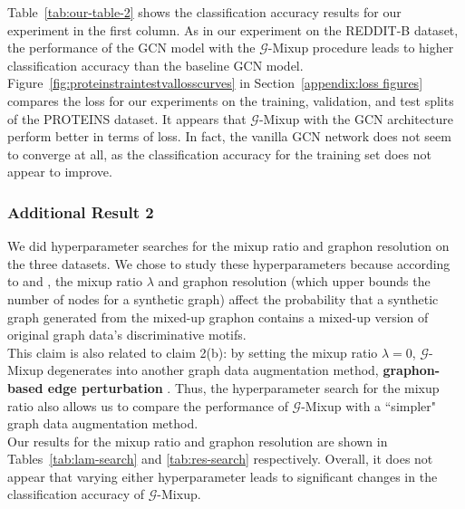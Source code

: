 Table~\ref{tab:our-table-2} shows the classification accuracy results for our experiment in the first column. As in our experiment on the REDDIT-B dataset, the performance of the GCN model with the $\mathcal{G}$-Mixup procedure leads to higher classification accuracy than the baseline GCN model. 
\\

Figure~\ref{fig:proteinstraintestvallosscurves} in Section~\ref{appendix:loss figures} compares the loss for our experiments on the training, validation, and test splits of the PROTEINS dataset. It appears that $\mathcal{G}$-Mixup with the GCN architecture perform better in terms of loss. In fact, the vanilla GCN network does not seem to converge at all, as the classification accuracy for the training set does not appear to improve. 

\subsubsection{Additional Result 2}\label{section:hyperparam}

We did hyperparameter searches for the mixup ratio and graphon resolution on the three datasets. We chose to study these hyperparameters because according to  and , the mixup ratio $\lambda$ and graphon resolution (which upper bounds the number of nodes for a synthetic graph) affect the probability that a synthetic graph generated from the mixed-up graphon contains a mixed-up version of original graph data's discriminative motifs.
\\

This claim is also related to claim 2(b): by setting the mixup ratio $\lambda=0$, $\mathcal{G}$-Mixup degenerates into another graph data augmentation method, \textbf{graphon-based edge perturbation} \cite{Hu:2021}. Thus, the hyperparameter search for the mixup ratio also allows us to compare the performance of $\mathcal{G}$-Mixup with a ``simpler" graph data augmentation method.
\\

Our results for the mixup ratio and graphon resolution are shown in Tables~\ref{tab:lam-search} and \ref{tab:res-search} respectively. Overall, it does not appear that varying either hyperparameter leads to significant changes in the classification accuracy of $\mathcal{G}$-Mixup.



